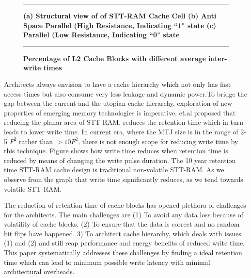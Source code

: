 \begin{wrapfigure}{l}{0.50\textwidth}
\centering
 \hrule
 \caption{\label{fig:motiv} \scriptsize \bf (a) Structural view of of STT-RAM Cache Cell (b) Anti Space Parallel (High Resistance, Indicating ``1" state (c) Parallel (Low Resistance, Indicating ``0" state}
\end{wrapfigure}

\begin{wrapfigure}{l}{0.50\textwidth}
\centering
 \hrule
 \caption{\label{fig:avg} \scriptsize \bf Percentage of L2 Cache Blocks with different average inter-write times}
\end{wrapfigure}




Architects always envision to have a cache hierarchy which not only has fast access times but also consume very less leakage and dynamic power.To bridge the gap between the current and the utopian cache hierarchy,  exploration of new properties of emerging memory technologies is imperative. \cite{sudhanva} et.al proposed that reducing the planar area of STT-RAM, reduces the retention time which in turn leads to lower write time.  In current era, where the MTJ size is in the range of 2-5 $F^2$ rather than $>10F^2$, there is not enough scope for reducing write time by this technique. Figure %
shows how write time reduces when retention time is reduced by means of changing the write pulse duration. The 10 year retention time STT-RAM cache design is traditional non-volatile STT-RAM. As we observe from the graph that write time significantly reduces, as we tend towards volatile STT-RAM.  %

The reduction of retention time of cache blocks has opened plethora of challenges for the architects. The main challenges are (1) To avoid any data loss because of volatility of cache blocks. (2) To ensure that the data is correct and no random bit flips have happened. 3) To architect cache hierarchy, which deals with issues (1) and (2) and still reap performance and energy benefits of reduced write time. This paper systematically addresses these challenges by finding a ideal retention time which can lead to minimum possible write latency with minimal architectural overheads.

